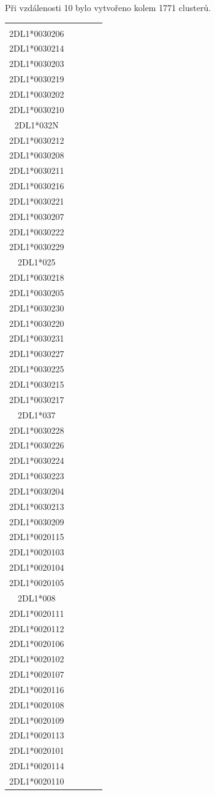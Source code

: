 \documentclass[czech,DP]{thesiskiv}
\numberwithin{equation}{section}
\begin{document}
\newpage
Při vzdálenosti 10 bylo vytvořeno kolem 1771 clusterů.
\begin{center}
\tiny
\begin{tabular}{ |c|c|c|c|c| }
\hline
	\Gape[0pt][2pt]{\makecell[tl]{\textbf{33} \\ 2DL1*0030206 \\ 2DL1*0030214 \\ 2DL1*0030203 \\ 2DL1*0030219 \\ 2DL1*0030202 \\ 2DL1*0030210 \\ 2DL1*032N \\ 2DL1*0030212 \\ 2DL1*0030208 \\ 2DL1*0030211 \\ 2DL1*0030216 \\ 2DL1*0030221 \\ 2DL1*0030207 \\ 2DL1*0030222 \\ 2DL1*0030229 \\ 2DL1*025 \\ 2DL1*0030218 \\ 2DL1*0030205 \\ 2DL1*0030230 \\ 2DL1*0030220 \\ 2DL1*0030231 \\ 2DL1*0030227 \\ 2DL1*0030225 \\ 2DL1*0030215 \\ 2DL1*0030217 \\ 2DL1*037 \\ 2DL1*0030228 \\ 2DL1*0030226 \\ 2DL1*0030224 \\ 2DL1*0030223 \\ 2DL1*0030204 \\ 2DL1*0030213 \\ 2DL1*0030209 }}
	& 
	\Gape[0pt][2pt]{\makecell[tl]{\textbf{17} \\ 2DL1*0020115 \\ 2DL1*0020103 \\ 2DL1*0020104 \\ 2DL1*0020105 \\ 2DL1*008 \\ 2DL1*0020111 \\ 2DL1*0020112 \\ 2DL1*0020106 \\ 2DL1*0020102 \\ 2DL1*0020107 \\ 2DL1*0020116 \\ 2DL1*0020108 \\ 2DL1*0020109 \\ 2DL1*0020113 \\ 2DL1*0020101 \\ 2DL1*0020114 \\ 2DL1*0020110}}

\end{tabular}
\end{center}
\end{document}
